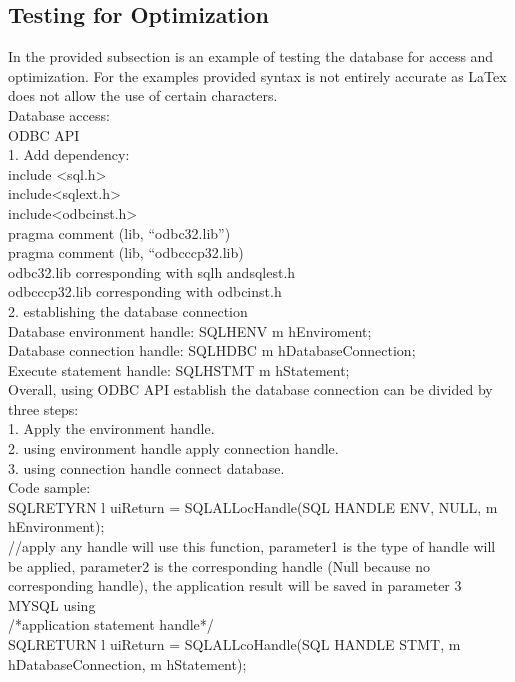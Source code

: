 \documentclass[onecolumn, draftclsnofoot,10pt, compsoc]{IEEEtran}
\begin{document}
\subsection{Testing for Optimization}
In the provided subsection is an example of testing the database for access and optimization. For the examples provided syntax is not entirely accurate as LaTex does not allow the use of certain characters. \\

Database access:\\  
ODBC API\\
1. Add dependency:\\ 
include <sql.h>\\
include<sqlext.h>\\
include<odbcinst.h>\\
pragma comment (lib, “odbc32.lib”)\\
pragma comment (lib, “odbcccp32.lib)\\

odbc32.lib corresponding with sqlh andsqlest.h\\
odbcccp32.lib corresponding with odbcinst.h\\
2. establishing the database connection \\
Database environment handle: SQLHENV m hEnviroment;\\
Database connection handle: SQLHDBC m hDatabaseConnection;\\ 
Execute statement handle: SQLHSTMT m hStatement; \\
Overall, using ODBC API establish the database connection can be divided by three steps:\\
1. Apply the environment handle.\\
2. using environment handle apply connection handle.\\ 
3. using connection handle connect database. \\

Code sample: \\
SQLRETYRN l uiReturn = SQLALLocHandle(SQL HANDLE ENV, NULL, m hEnvironment);\\
//apply any handle will use this function, parameter1 is the type of handle will be applied, parameter2 is the corresponding handle (Null because no corresponding handle), the application result will be saved in parameter 3\\

MYSQL using\\
/*application statement handle*/\\
SQLRETURN l uiReturn = SQLALLcoHandle(SQL HANDLE STMT, m hDatabaseConnection, m hStatement); \\
\end{document}
